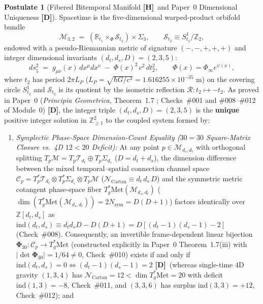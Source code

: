 \documentclass[11pt,a4paper]{article}
\newcommand{\catD}{\textbf{\textcolor{blue!75!black}{[D]}}}
\newcommand{\catH}{\textbf{\textcolor{orange!85!black}{[H]}}}
\theoremstyle{definition}
\newtheorem{postulate}[theorem]{Postulate}
\theoremstyle{remark}
\begin{document}
\begin{postulate}[Fibered Bitemporal Manifold \catH\ and Paper~0 Dimensional Uniqueness \catD]
\label{post:bundle}
\label{post:manifold}
Spacetime is the five-dimensional warped-product orbifold bundle
\begin{equation}
  \mathcal{M}_{3,2} \;=\; \left(\mathbb{R}_{t_1} \times_{\Phi} \mathcal{S}_{t_2}\right) \times \Sigma_3,
  \qquad
  \mathcal{S}_{t_2} \equiv S^1_{t_2}/\mathbb{Z}_2 ,
  \label{eq:warped_product_m32}
\end{equation}
endowed with a pseudo-Riemannian metric of signature $(-,-,+,+,+)$ and integer dimensional invariants $(d_t, d_s, D) = (2, 3, 5)$:
\begin{equation}
  ds_5^2 \;=\; g_{\mu\nu}(x)\,dx^\mu dx^\nu \;-\; \Phi(x)^2\,c^2\,dt_2^2 ,
  \qquad \Phi(x) = \Phi_\infty e^{\psi(x)},
  \label{eq:metric5}
\end{equation}
where $t_2$ has period $2\pi L_P$ ($L_P = \sqrt{\hbar G/c^3} = 1.616255 \times 10^{-35}\text{ m}$) on the covering circle $S^1_{t_2}$ and $\mathcal{S}_{t_2}$ is its quotient by the isometric reflection $\mathcal{R}: t_2 \mapsto -t_2$. As proved in Paper~0 (\textit{Principia Geometrica}, Theorem~1.7 \cite{JV_Paper0}; Checks~\#001 and \#008--\#012 of Module~0) \catD, the integer triple $(d_t, d_s, D) = (2, 3, 5)$ is the \textbf{unique} positive integer solution in $\mathbb{Z}_{\ge 1}^2$ to the coupled system formed by:
\begin{enumerate}
  \item[\textnormal{(a)}] \emph{Symplectic Phase-Space Dimension-Count Equality ($30 = 30$ Square-Matrix Closure vs.\ 4D $12 < 20$ Deficit):} At any point $p \in \mathcal{M}_{d_s,d_t}$ with orthogonal splitting $T_p\mathcal{M} = T_p\mathcal{T}_{d_t} \oplus T_p\Sigma_{d_s}$ ($D = d_t + d_s$), the dimension difference between the mixed temporal--spatial connection channel space $\mathcal{C}_p = T^*_p\mathcal{T}_{d_t} \otimes T^*_p\Sigma_{d_s} \otimes T_p\mathcal{M}$ ($\mathcal{N}_{\text{Cartan}} \equiv d_t\,d_s\,D$) and the symmetric metric cotangent phase-space fiber $T^*_g\text{Met}(\mathcal{M}_{d_s,d_t})$ ($\dim(T^*_g\text{Met}(\mathcal{M}_{d_s,d_t})) = 2 N_{\text{sym}} = D(D+1)$) factors identically over $\mathbb{Z}[d_t, d_s]$ as $\text{ind}(d_t, d_s) \equiv d_t d_s D - D(D+1) = D[(d_t - 1)(d_s - 1) - 2]$ (Check~\#008). Consequently, an invertible frame-dependent linear bijection $\bm{\Phi}_{30}: \mathcal{C}_p \to T^*_g\text{Met}$ (constructed explicitly in Paper~0 Theorem~1.7(iii) with $|\det\bm{\Phi}_{30}| = 1/64 \neq 0$, Check~\#010) exists if and only if $\text{ind}(d_t, d_s) = 0 \Longleftrightarrow (d_t - 1)(d_s - 1) = 2$ \catD\ (whereas single-time 4D gravity $(1,3,4)$ has $\mathcal{N}_{\text{Cartan}} = 12 < \dim T^*_g\text{Met} = 20$ with deficit $\text{ind}(1,3) = -8$, Check~\#011, and $(3,3,6)$ has surplus $\text{ind}(3,3) = +12$, Check~\#012); and

\end{enumerate}
\end{postulate}
\end{document}

